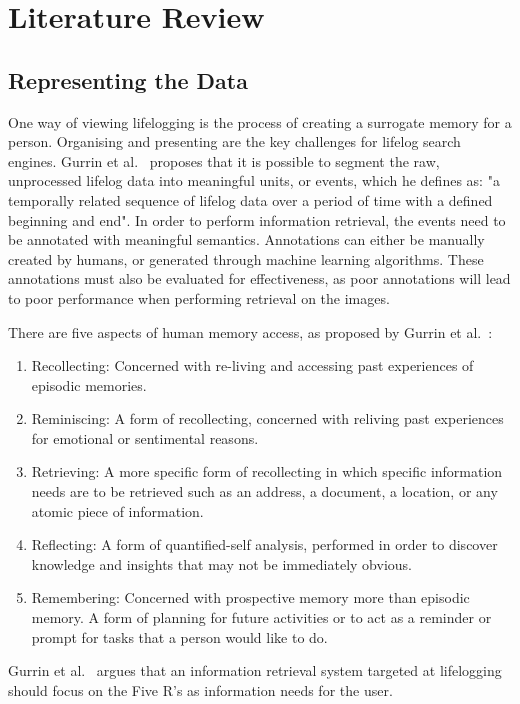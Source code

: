 \section{Literature Review}

\subsection{Representing the Data}
One way of viewing lifelogging is the process of creating a surrogate memory for a person. Organising and presenting are the key challenges for lifelog search engines. Gurrin et al.~\cite{gurrin2014lifelogging} proposes that it is possible to segment the raw, unprocessed lifelog data into meaningful units, or events, which he defines as: "a temporally related sequence of lifelog data over a period of time with a defined beginning and end". In order to perform information retrieval, the events need to be annotated with meaningful semantics. Annotations can either be manually created by humans, or generated through machine learning algorithms. These annotations must also be evaluated for effectiveness, as poor annotations will lead to poor performance when performing retrieval on the images.

There are five aspects of human memory access, as proposed by Gurrin et al.~\cite{gurrin2014lifelogging}:
\begin{enumerate}
    \item Recollecting: Concerned with re-living and accessing past experiences of episodic memories.
    \item Reminiscing: A form of recollecting, concerned with reliving past experiences for emotional or sentimental reasons.
    \item Retrieving: A more specific form of recollecting  in which specific information needs are to be retrieved such as an address, a document, a location, or any atomic piece of information.
    \item Reflecting: A form of quantified-self analysis, performed in order to discover knowledge and insights that may not be immediately obvious.
    \item Remembering: Concerned with prospective memory more than episodic memory. A form of planning for future activities or to act as a reminder or prompt for tasks that a person would like to do.
\end{enumerate}
Gurrin et al.~\cite{gurrin2014lifelogging} argues that an information retrieval system targeted at lifelogging should focus on the Five R's as information needs for the user.

